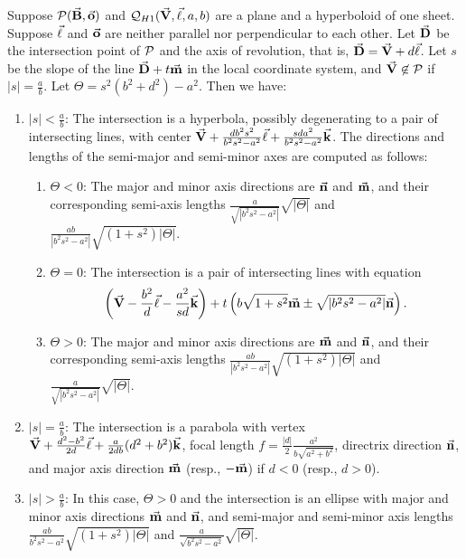 \begin{theorem}
\label{thm:hy-1}
     Suppose ${\cal P}(\vec{\bf B},\vec{\bf o})$ and
${\cal Q}_{H1}(\vec{\bf V},\vec{\bf \ell},a,b)$ are a plane and a hyperboloid of
one sheet.  Suppose $\vec{\bf \ell}$ and $\vec{\bf o}$ are neither parallel nor 
perpendicular to each other.  Let $\vec{\bf D}$ be the intersection point of 
${\cal P}$ and the axis of revolution, 
that is, $\vec{\bf D}=\vec{\bf V}+d\vec{\bf \ell}$.
Let $s$ be the slope of the line $\vec{\bf D}+t\vec{\bf m}$ in the local
coordinate system, and $\vec{\bf V}\not\in{\cal P}$ if 
$|s|=\frac{a}{b}$.  Let $\Theta=s^2(b^2+d^2)-a^2$.  Then we have:
\begin{enumerate}
     \item $|s|<\frac{a}{b}$: The intersection is a hyperbola, possibly
          degenerating to a pair of intersecting lines, with center
          $\vec{\bf V}+\frac{db^2s^2}{b^2s^2-a^2}\vec{\bf \ell}+
          \frac{sda^2}{b^2s^2-a^2}\vec{\bf k}$.  The directions and lengths of
          the semi-major and semi-minor axes are computed as follows:
     \begin{enumerate}
          \item $\Theta<0$: The major and minor axis directions are 
               $\vec{\bf n}$ and $\vec{\bf m}$, and their corresponding semi-axis 
               lengths $\frac{a}{\sqrt{|b^2s^2-a^2|}}\sqrt{|\Theta|}$ and 
               $\frac{ab}{|b^2s^2-a^2|}\sqrt{(1+s^2)|\Theta|}$.
          \item \label{ref:enum-case} $\Theta=0$: The intersection is a pair of
               intersecting lines with equation
\[             \left(\vec{\bf V}-\frac{b^2}{d}\vec{\bf \ell}-
               \frac{a^2}{sd}\vec{\bf k}\right)+t\left(b\sqrt{1+s^2}\vec{\bf m}\pm
               \sqrt{|b^2s^2-a^2|}\vec{\bf n}\right). \]
          \item $\Theta>0$: The major and minor axis directions are
               $\vec{\bf m}$ and $\vec{\bf n}$, and their corresponding semi-axis 
               lengths $\frac{ab}{|b^2s^2-a^2|}\sqrt{(1+s^2)|\Theta|}$ and
               $\frac{a}{\sqrt{|b^2s^2-a^2|}}\sqrt{|\Theta|}$.
     \end{enumerate}
     \item $|s|=\frac{a}{b}$: The intersection is a parabola with vertex
          $\vec{\bf V}+\frac{d^2-b^2}{2d}\vec{\bf \ell}+
          \frac{a}{2db}(d^2+b^2)\vec{\bf k}$, focal length 
          $f=\frac{|d|}{2}\frac{a^2}{b\sqrt{a^2+b^2}}$, directrix direction
          $\vec{\bf n}$, and major axis direction
          $\vec{\bf m}$ (resp., $-\vec{\bf m}$) if $d<0$ (resp., $d>0$).
     \item $|s|>\frac{a}{b}$: In this case, $\Theta>0$ and the intersection is
          an ellipse with major and minor axis directions $\vec{\bf m}$ and
          $\vec{\bf n}$, and semi-major and semi-minor axis lengths 
          $\frac{ab}{b^2s^2-a^2}\sqrt{(1+s^2)|\Theta|}$ and
          $\frac{a}{\sqrt{b^2s^2-a^2}}\sqrt{|\Theta|}$.  
\end{enumerate}
\end{theorem}
